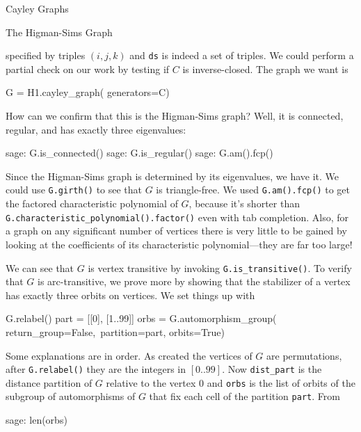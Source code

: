\begin{chap}{Cayley Graphs}
\begin{sect}{The Higman-Sims Graph}
\begin{para}
specified by triples $(i,j,k)$ and \verb|ds| is indeed a set of triples.
We could perform a partial check on our work by testing if $C$ is inverse-closed.
The graph we want is
\end{para}
%
\begin{sageblock}
    G = H1.cayley_graph( generators=C)
\end{sageblock}
%
\begin{para}
How can we confirm that this is the Higman-Sims graph?  Well, it is connected,
regular, and has exactly three eigenvalues:
\end{para}
%
\begin{sageexample}
    sage: G.is_connected()
    sage: G.is_regular()
    sage: G.am().fcp()
\end{sageexample}
%
\begin{para}
Since the Higman-Sims graph is determined by its eigenvalues, we have it.
We could use \verb|G.girth()| to see that $G$ is triangle-free.
We used \verb|G.am().fcp()| to get the factored characteristic polynomial
of $G$, because it's shorter than \verb|G.characteristic_polynomial().factor()|
even with tab completion. Also, for a graph on any significant number of vertices
there is very little to be gained by looking at the coefficients of its
characteristic polynomial---they are far too large!
\end{para}
%
\begin{para}
We can see that $G$ is vertex transitive by invoking \verb|G.is_transitive()|.
To verify that $G$ is arc-transitive, we prove more by showing
that the stabilizer of a vertex has exactly three orbits on vertices.
We set things up with
\end{para}
%
\begin{sageblock}
    G.relabel()
    part = [[0], [1..99]]
    orbs = G.automorphism_group( return_group=False,\
      partition=part, orbits=True)
\end{sageblock}
%
\begin{para}
Some explanations are in order. As created the vertices of $G$ are permutations,
after \verb|G.relabel()| they are the integers in $[0..99]$. Now
\verb|dist_part| is the distance partition of $G$ relative to the vertex $0$
and \verb|orbs| is the list of orbits of the subgroup of automorphisms of $G$
that fix each cell of the partition \texttt{part}. From
\end{para}
%
\begin{sageexample}
    sage: len(orbs)
\end{sageexample}

\end{sect}
\end{chap}
